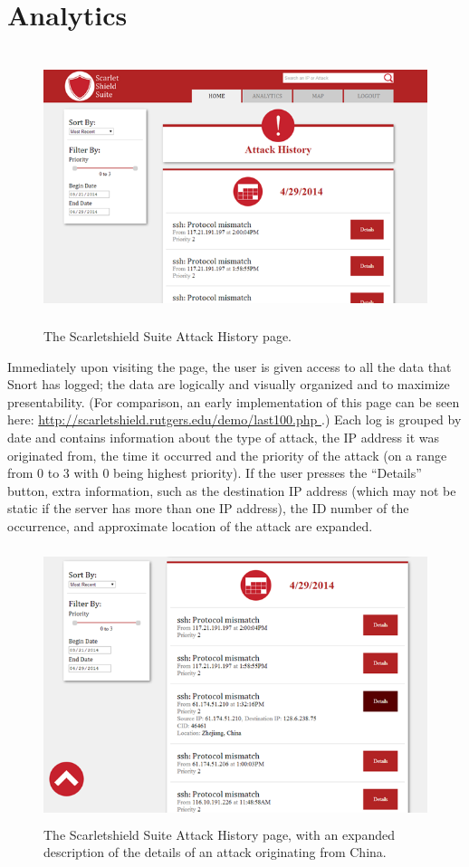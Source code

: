 \documentclass[12pt,letterpaper,titlepage]{report}
\begin{document}
{\section{Analytics}

\begin{figure}[b!]
\centering
  \includegraphics[height=8cm]{./history.png}
  \caption{The Scarletshield Suite Attack History page.}
\end{figure}

Immediately upon visiting the page, the user is given access to all the data
that Snort has logged; the data are logically and visually organized and to
maximize presentability. (For comparison, an early implementation of this
page can be seen here: \url{http://scarletshield.rutgers.edu/demo/last100.php }.) 
Each log is grouped by date and contains information
about the type of attack, the IP address it was originated from, the time it
occurred and the priority of the attack (on a range from 0 to 3 with 0 being
highest priority). If the user presses the ``Details'' button, extra information,
such as the destination IP address (which may not be static if the server has
more than one IP address), the ID number of the occurrence, and approximate
location of the attack are expanded.


\begin{figure}[t!]
\centering
  \includegraphics[height=8cm]{./historydet.png}
  \caption{The Scarletshield Suite Attack History page, with an expanded
  description of the details of an attack originating from China.}
\end{figure}

}
\end{document}
